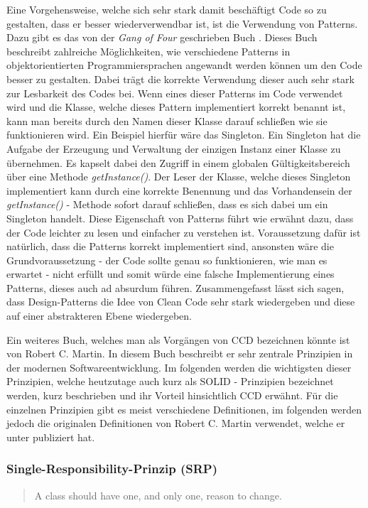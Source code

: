 \SuperPar Eine Vorgehensweise, welche sich sehr stark damit beschäftigt Code so zu gestalten, dass er besser wiederverwendbar ist, ist die Verwendung von Patterns. Dazu gibt es das von der \textit{Gang of Four} geschrieben Buch \cite{Gamma1995}. Dieses Buch beschreibt zahlreiche Möglichkeiten, wie verschiedene Patterns in objektorientierten Programmiersprachen angewandt werden können um den Code besser zu gestalten. Dabei trägt die korrekte Verwendung dieser auch sehr stark zur Lesbarkeit des Codes bei. Wenn eines dieser Patterns im Code verwendet wird und die Klasse, welche dieses Pattern implementiert korrekt benannt ist, kann man bereits durch den Namen dieser Klasse darauf schließen wie sie funktionieren wird. Ein Beispiel hierfür wäre das Singleton. Ein Singleton hat die Aufgabe der Erzeugung und Verwaltung der einzigen Instanz einer Klasse zu übernehmen. Es kapselt dabei den Zugriff in einem globalen Gültigkeitsbereich über eine Methode \textit{getInstance()}. Der Leser der Klasse, welche dieses Singleton implementiert kann durch eine korrekte Benennung und das Vorhandensein der \textit{getInstance()} - Methode sofort darauf schließen, dass es sich dabei um ein Singleton handelt. Diese Eigenschaft von Patterns führt wie erwähnt dazu, dass der Code leichter zu lesen und einfacher zu verstehen ist. Voraussetzung dafür ist natürlich, dass die Patterns korrekt implementiert sind, ansonsten wäre die Grundvoraussetzung - der Code sollte genau so funktionieren, wie man es erwartet - nicht erfüllt und somit würde eine falsche Implementierung eines Patterns, dieses auch ad absurdum führen. Zusammengefasst lässt sich sagen, dass Design-Patterns die Idee von Clean Code sehr stark wiedergeben und diese auf einer abstrakteren Ebene wiedergeben. 

\SuperPar Ein weiteres Buch, welches man als Vorgängen von CCD bezeichnen könnte ist \cite{Martin2002} von Robert C. Martin. In diesem Buch beschreibt er sehr zentrale Prinzipien in der modernen Softwareentwicklung. Im folgenden werden die wichtigsten dieser Prinzipien, welche heutzutage auch kurz als SOLID - Prinzipien bezeichnet werden, kurz beschrieben und ihr Vorteil hinsichtlich CCD erwähnt. Für die einzelnen Prinzipien gibt es meist verschiedene Definitionen, im folgenden werden jedoch die originalen Definitionen von Robert C. Martin verwendet, welche er unter \cite{Martin2016} publiziert hat. 

\subsubsection{Single-Responsibility-Prinzip (SRP)}
\begin{quotation}
	A class should have one, and only one, reason to change.
\end{quotation}

